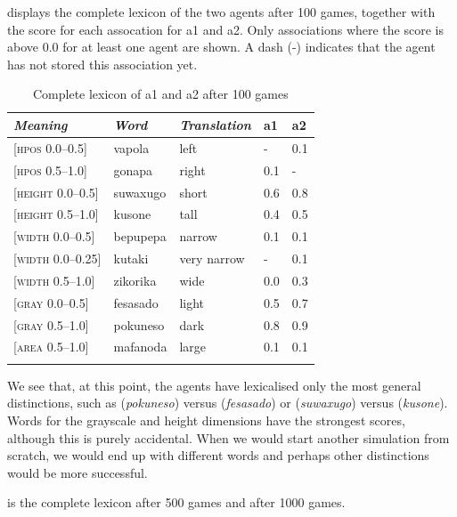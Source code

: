  displays the complete lexicon of the two agents after 100 games, 
together with the score for each assocation for 
{\bfshape  a1} and {\bfshape  a2}. Only associations where the 
score is above 0.0 for at least one agent are shown. 
A dash (-) indicates that the agent has not stored 
this association yet. 


\begin{table}
\begin{center}
\begin{tabular}{ l  l  l  l  l }
\lsptoprule
{\itshape Meaning}&{\itshape Word}&{\itshape Translation} & {\bfshape  a1}&{\bfshape  a2} \\ \midrule
{}[\textsc{hpos} 0.0–0.5] & vapola&left&-&0.1\\ 
{}[\textsc{hpos} 0.5–1.0]& gonapa&right &0.1&-\\ 
{}[\textsc{height} 0.0–0.5]&suwaxugo&short &0.6&0.8\\ 
{}[\textsc{height} 0.5–1.0]& kusone&tall &0.4&0.5\\ 
{}[\textsc{width} 0.0–0.5]&bepupepa&narrow &0.1&0.1\\ 
{}[\textsc{width} 0.0–0.25]&kutaki&very narrow &-&0.1\\ 
{}[\textsc{width} 0.5–1.0]& zikorika&wide &0.0&0.3\\ 
{}[\textsc{gray} 0.0–0.5]& fesasado&light &0.5&0.7\\ 
{}[\textsc{gray} 0.5–1.0]& pokuneso&dark &0.8&0.9\\ 
{}[\textsc{area} 0.5–1.0]& mafanoda&large &0.1&0.1\\ 
\lspbottomrule
\end{tabular}
\caption{\label{tab:lex100}Complete lexicon of {\bfshape  a1} and {\bfshape  a2} after 100 games}
\end{center}
\end{table}
We see that, at this point, the agents have lexicalised 
only the most general distinctions, such as  (\emph{pokuneso}) 
versus  (\emph{fesasado}) or  (\emph{suwaxugo}) versus  
(\emph{kusone}). Words for the grayscale and height dimensions
have the strongest scores, although this is purely accidental. 
When we would start another simulation from scratch,
we would end up with different words and perhaps 
other distinctions would be more successful. 

 is the complete lexicon after 500 games and  after 1000 games. 


